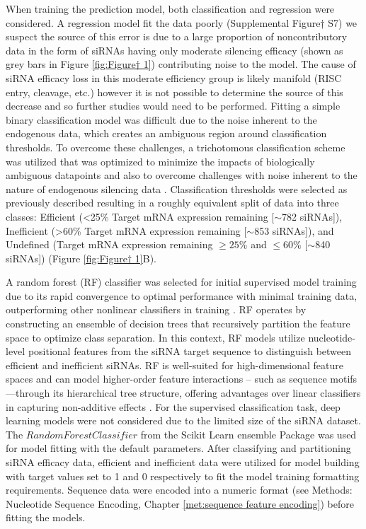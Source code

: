 \documentclass{report}
\begin{document}
When training the prediction model, both classification and regression were considered. A regression model fit the data poorly (Supplemental Figure† S7) we suspect the source of this error is due to a large proportion of noncontributory data in the form of siRNAs having only moderate silencing efficacy (shown as grey bars in Figure \ref{fig:Figure† 1}) contributing noise to the model. The cause of siRNA efficacy loss in this moderate efficiency group is likely manifold (RISC entry, cleavage, etc.) however it is not possible to determine the source of this decrease and so further studies would need to be performed. Fitting a simple binary classification model was difficult due to the noise inherent to the endogenous data, which creates an ambiguous region around classification thresholds. To overcome these challenges, a trichotomous classification scheme was utilized that was optimized to minimize the impacts of biologically ambiguous datapoints and also to overcome challenges with noise inherent to the nature of endogenous silencing data \cite{monopoli_asymmetric_2023}. Classification thresholds were selected as previously described \cite{monopoli_asymmetric_2023} resulting in a roughly equivalent split of data into three classes: Efficient (<25\% Target mRNA expression remaining [$\sim$782 siRNAs]), Inefficient (>60\% Target mRNA expression remaining [$\sim$853 siRNAs]), and Undefined (Target mRNA expression remaining $\geq25\%$ and $\leq60\%$ [$\sim$840 siRNAs]) (Figure \ref{fig:Figure† 1}B).

A random forest (RF) classifier was selected for initial supervised model training due to its rapid convergence to optimal performance with minimal training data, outperforming other nonlinear classifiers in training \cite{fernandez-delgado_we_2014}. RF operates by constructing an ensemble of decision trees that recursively partition the feature space to optimize class separation. In this context, RF models utilize nucleotide-level positional features from the siRNA target sequence to distinguish between efficient and inefficient siRNAs. RF is well-suited for high-dimensional feature spaces and can model higher-order feature interactions – such as sequence motifs—through its hierarchical tree structure, offering advantages over linear classifiers in capturing non-additive effects \cite{breiman_random_2001}. For the supervised classification task, deep learning models were not considered due to the limited size of the siRNA dataset.
The $RandomForestClassifier$ from the Scikit Learn ensemble Package was used for model fitting \cite{pedregosa_scikit-learn_2011} with the default parameters. After classifying and partitioning siRNA efficacy data, efficient and inefficient data were utilized for model building with target values set to 1 and 0 respectively to fit the model training formatting requirements.  Sequence data were encoded into a numeric format (see Methods: Nucleotide Sequence Encoding, Chapter \ref{met:sequence feature encoding}) before fitting the models.
\end{document}
